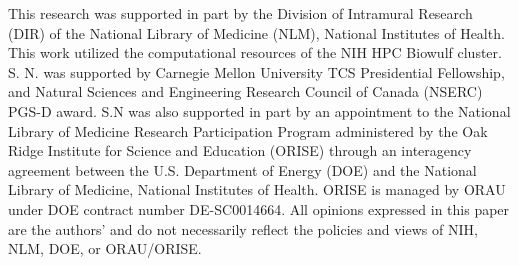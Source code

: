 
This research was supported in part by the Division of Intramural Research (DIR) of the National Library of Medicine (NLM), National Institutes of Health.
This work utilized the computational resources of the NIH HPC Biowulf cluster.
S. N. was supported by Carnegie Mellon University TCS Presidential Fellowship, and Natural Sciences and Engineering Research Council of Canada (NSERC) PGS-D award.
S.N was also supported in part by an appointment to the National Library of Medicine Research Participation Program administered by the Oak Ridge Institute for Science and Education (ORISE) through an interagency agreement between the U.S. Department of Energy (DOE) and the National Library of Medicine, National Institutes of Health.
ORISE is managed by ORAU under DOE contract number DE-SC0014664.
All opinions expressed in this paper are the authors’ and do not necessarily reflect the policies and views of NIH, NLM, DOE, or ORAU/ORISE.


